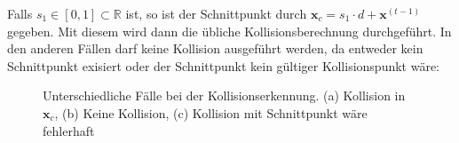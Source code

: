 Falls $s_1 \in [0, 1] \subset \mathbb{R}$ ist, so ist der Schnittpunkt durch $\textbf{x}_c = s_1 \cdot d + \textbf{x}^{(t-1)}$ gegeben. 
Mit diesem wird dann die übliche Kollisionsberechnung durchgeführt.
In den anderen Fällen darf keine Kollision ausgeführt werden, da entweder kein Schnittpunkt exisiert oder der Schnittpunkt kein gültiger Kollisionspunkt wäre:

\begin{figure}[H]
	\label{fig:collision}
	\hspace{-1.8cm}
		\hspace{-2.4cm}
	\centering
	\caption{Unterschiedliche Fälle bei der Kollisionserkennung.
	(a) Kollision in $\textbf{x}_c$, (b) Keine Kollision, (c) Kollision mit Schnittpunkt wäre fehlerhaft}
\end{figure}

